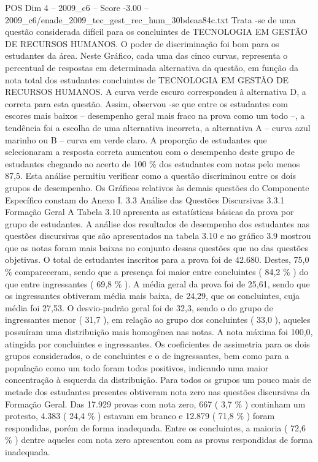 \begin{textsample}{POS Dim 4 – 2009\_c6 – Score -3.00 – 2009\_c6/enade\_2009\_tec\_gest\_rec\_hum\_30bdeaa84c.txt}
Trata -se de uma questão considerada difícil para os concluintes de TECNOLOGIA EM GESTÃO DE RECURSOS HUMANOS.
O poder de discriminação foi bom para os estudantes da área.
Neste Gráfico, cada uma das cinco curvas, representa o percentual de respostas em determinada alternativa da questão, em função da nota total dos estudantes concluintes de TECNOLOGIA EM GESTÃO DE RECURSOS HUMANOS.
A curva verde escuro correspondeu à alternativa D, a correta para esta questão.
Assim, observou -se que entre os estudantes com escores mais baixos – desempenho geral mais fraco na prova como um todo –, a tendência foi a escolha de uma alternativa incorreta, a alternativa A – curva azul marinho ou B – curva em verde claro.
A proporção de estudantes que selecionaram a resposta correta aumentou com o desempenho deste grupo de estudantes chegando ao acerto de 100 \% dos estudantes com notas pelo menos 87,5.
Esta análise permitiu verificar como a questão discriminou entre os dois grupos de desempenho.
Os Gráficos relativos às demais questões do Componente Específico constam do Anexo I. 3.3 Análise das Questões Discursivas 3.3.1 Formação Geral A Tabela 3.10 apresenta as estatísticas básicas da prova por grupo de estudantes.
A análise dos resultados de desempenho dos estudantes nas questões discursivas que são apresentados na tabela 3.10 e no gráfico 3.9 mostrou que as notas foram mais baixas no conjunto dessas questões que no das questões objetivas.
O total de estudantes inscritos para a prova foi de 42.680.
Destes, 75,0 \% compareceram, sendo que a presença foi maior entre concluintes ( 84,2 \% ) do que entre ingressantes ( 69,8 \% ).
A média geral da prova foi de 25,61, sendo que os ingressantes obtiveram média mais baixa, de 24,29, que os concluintes, cuja média foi 27,53.
O desvio-padrão geral foi de 32,3, sendo o do grupo de ingressantes menor ( 31,7 ), em relação ao grupo dos concluintes ( 33,0 ), aqueles possuíram uma distribuição mais homogênea nas notas.
A nota máxima foi 100,0, atingida por concluintes e ingressantes.
Os coeficientes de assimetria para os dois grupos considerados, o de concluintes e o de ingressantes, bem como para a população como um todo foram todos positivos, indicando uma maior concentração à esquerda da distribuição.
Para todos os grupos um pouco mais de metade dos estudantes presentes obtiveram nota zero nas questões discursivas da Formação Geral.
Das 17.929 provas com nota zero, 667 ( 3,7 \% ) continham um protesto, 4.383 ( 24,4 \% ) estavam em branco e 12.879 ( 71,8 \% ) foram respondidas, porém de forma inadequada.
Entre os concluintes, a maioria ( 72,6 \% ) dentre aqueles com nota zero apresentou com as provas respondidas de forma inadequada.

\end{textsample}
